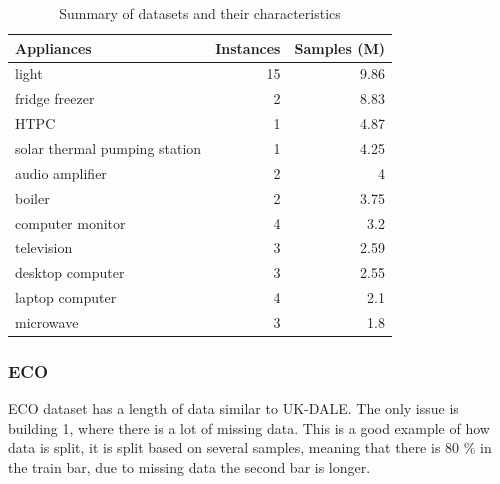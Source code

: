 \begin{table}[H]
    \caption{Summary of datasets and their characteristics}
    \centering
    \begin{tabular}{lrr}
        \toprule
        \textbf{Appliances}           & \textbf{Instances} & \textbf{Samples (M)} \\
        \midrule
        light                         & 15                 & 9.86                                  \\
        fridge freezer                & 2                  & 8.83                                  \\
        HTPC                          & 1                  & 4.87                                  \\
        solar thermal pumping station & 1                  & 4.25                                  \\
        audio amplifier               & 2                  & 4                                     \\
        boiler                        & 2                  & 3.75                                  \\
        computer monitor              & 4                  & 3.2                                   \\
        television                    & 3                  & 2.59                                  \\
        desktop computer              & 3                  & 2.55                                  \\
        laptop computer               & 4                  & 2.1                                   \\
        microwave                     & 3                  & 1.8                                   \\
        \bottomrule
    \end{tabular}
    \label{tab:ukdale_table}
\end{table}


\subsubsection{ECO}
ECO \cite{ECO} dataset has a length of data similar to UK-DALE. 
The only issue is building 1, where there is a lot of missing data.
This is a good example of how data is split, it is split based on several samples,
meaning that there is 80 \% in the train bar, due to missing data the second bar is longer. 

